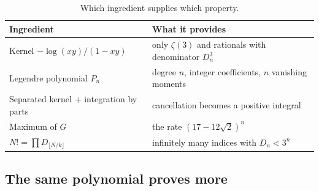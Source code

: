 \documentclass[11pt]{article}
\newcommand{\Dn}{D_n}
\theoremstyle{plain}
\theoremstyle{definition}
\theoremstyle{remark}
\begin{document}
\begin{table}[ht]
\centering
\begin{tabular}{@{}ll@{}}
\toprule
Ingredient & What it provides\\
\midrule
Kernel $-\log(xy)/(1-xy)$ & only $\zeta(3)$ and rationals with denominator $\Dn^3$\\
Legendre polynomial $P_n$ & degree $n$, integer coefficients, $n$ vanishing moments\\
Separated kernel $+$ integration by parts & cancellation becomes a positive integral\\
Maximum of $G$ & the rate $(17-12\sqrt2)^n$\\
$N!=\prod D_{\lfloor N/k\rfloor}$ & infinitely many indices with $\Dn<3^n$\\
\bottomrule
\end{tabular}
\caption{Which ingredient supplies which property.}
\label{tab:ingredients}
\end{table}

\subsection{The same polynomial proves more}\label{sec:relatives}
\end{document}
